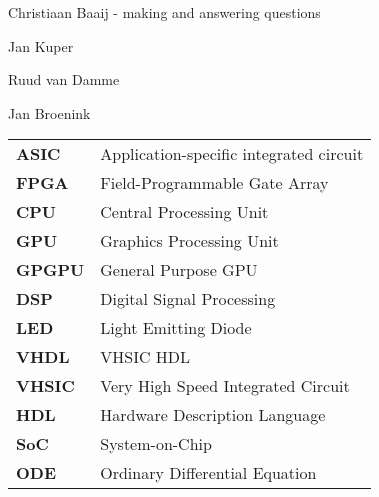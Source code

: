 
\begin{acknowledgements}      
\begin{itemizens}
	\item Christiaan Baaij - making \clash{} and answering questions
	\item Jan Kuper
	\item Ruud van Damme
	\item Jan Broenink
\end{itemizens}

\end{acknowledgements}



\begin{acronyms}
\begin{tabular}{>{\bfseries}l l}
	ASIC & Application-specific integrated circuit \\
	FPGA & Field-Programmable Gate Array \\
	CPU & Central Processing Unit \\
	GPU & Graphics Processing Unit \\
	GPGPU & General Purpose GPU \\
	DSP & Digital Signal Processing \\
	LED & Light Emitting Diode \\
	VHDL & VHSIC HDL \\
	VHSIC & Very High Speed Integrated Circuit \\
	HDL & Hardware Description Language \\
	SoC & System-on-Chip \\ 
	ODE & Ordinary Differential Equation \\
\end{tabular}		
\end{acronyms}    

  
